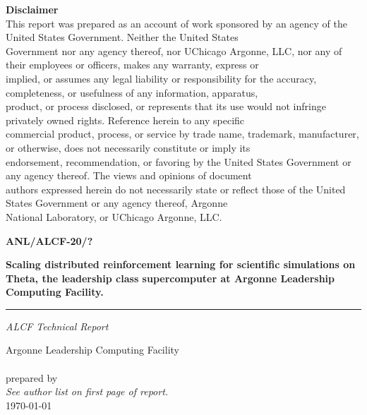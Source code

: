 \documentclass[11pt]{article}
\newcommand{\ReportTitle}{Scaling distributed reinforcement learning for scientific simulations on Theta, the leadership class supercomputer at Argonne Leadership Computing Facility.} %
\newcommand{\SubTitle}{ALCF Technical Report} %
\newcommand{\ReportNumber}{ANL/ALCF-20/?} %
\begin{document}
\begin{minipage}[l]{1.1\textwidth}
  \vspace{0.4truein}
  \scriptsize
  \textsf{\textbf{Disclaimer}}\\
  \textsf{
    This report was prepared as an account of work sponsored by an agency of the
    United States Government. Neither the United States\\
    Government nor any agency thereof, nor UChicago Argonne, LLC, nor any of
    their employees or officers, makes any warranty, express or\\
    implied, or assumes any legal liability or responsibility for the accuracy,
    completeness, or usefulness of any information, apparatus,\\
    product, or process disclosed, or represents that its use would not infringe
    privately owned rights. Reference herein to any specific\\
    commercial product, process, or service by trade name, trademark,
    manufacturer, or otherwise, does not necessarily constitute or imply its\\
    endorsement, recommendation, or favoring by the United States Government or
    any agency thereof. The views and opinions of document\\
    authors expressed herein do not necessarily state or reflect those of the
    United States Government or any agency thereof, Argonne\\
    National Laboratory, or UChicago Argonne, LLC.
  }
\end{minipage}

\newpage
\pagestyle{empty}
\begin{minipage}[r]{\textwidth}
  \hfill \textsf{\textbf{\Large{\ReportNumber}}}\\
  \vspace{2.2truein}
\end{minipage}

\hspace{0.4truein}
\begin{minipage}[l]{0.95\textwidth}
  \textsf{\textbf{\LARGE{\ReportTitle}}}
  \vspace{0.2truein}
  \hrule height 1.2pt
  \vspace{0.2truein}
  \textsf{\textit{\Large{\SubTitle}}}\\
\end{minipage}

\hspace{0.4truein}
\begin{minipage}[l]{\textwidth}
  \vspace{0.7truein}
  \textsf{Argonne Leadership Computing Facility}\\
  \\
  \textsf{prepared by}\\
  \textsf{\textit{See author list on first page of report.}}\\

  \vspace{0.4truein}
  \textsf{\today}
\end{minipage}
\end{document}
